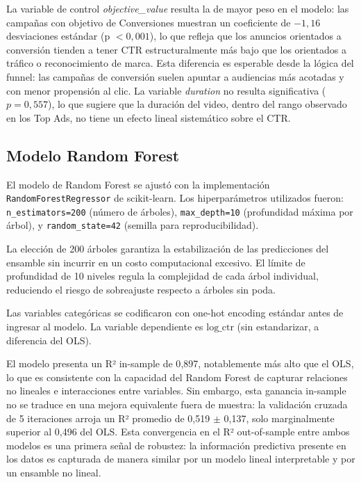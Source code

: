 \documentclass[12pt, a4paper]{report}
\begin{document}
La variable de control \textit{objective\_value} resulta la de mayor peso en el modelo:
las campañas con objetivo de Conversiones muestran un coeficiente de $-1{,}16$ desviaciones
estándar (p $< 0{,}001$), lo que refleja que los anuncios orientados a conversión tienden a
tener CTR estructuralmente más bajo que los orientados a tráfico o reconocimiento de marca.
Esta diferencia es esperable desde la lógica del funnel: las campañas de conversión
suelen apuntar a audiencias más acotadas y con menor propensión al clic. La variable
\textit{duration} no resulta significativa ($p = 0{,}557$), lo que sugiere que la duración
del video, dentro del rango observado en los Top Ads, no tiene un efecto lineal sistemático
sobre el CTR.

\subsection{Modelo Random Forest}

\begin{sloppypar}
El modelo de Random Forest se ajustó con la implementación \texttt{Random\-Forest\-Regressor}
de scikit-learn. Los hiperparámetros utilizados fueron: \texttt{n\_estimators=200}
(número de árboles), \texttt{max\_depth=10} (profundidad máxima por árbol),
y \texttt{random\_state=42} (semilla para reproducibilidad).
\end{sloppypar} La elección de
200 árboles garantiza la estabilización de las predicciones del ensamble sin incurrir en un
costo computacional excesivo. El límite de profundidad de 10 niveles regula la complejidad
de cada árbol individual, reduciendo el riesgo de sobreajuste respecto a árboles sin poda.

Las variables categóricas se codificaron con one-hot encoding estándar antes de ingresar al
modelo. La variable dependiente es $\text{log\_ctr}$ (sin estandarizar, a diferencia del
OLS).

El modelo presenta un R² in-sample de 0{,}897, notablemente más alto que el OLS, lo que es
consistente con la capacidad del Random Forest de capturar relaciones no lineales e
interacciones entre variables. Sin embargo, esta ganancia in-sample no se traduce en una
mejora equivalente fuera de muestra: la validación cruzada de 5 iteraciones arroja un R²
promedio de 0{,}519 $\pm$ 0{,}137, solo marginalmente superior al 0{,}496 del OLS. Esta
convergencia en el R² out-of-sample entre ambos modelos es una primera señal de robustez:
la información predictiva presente en los datos es capturada de manera similar por un modelo
lineal interpretable y por un ensamble no lineal.
\end{document}
